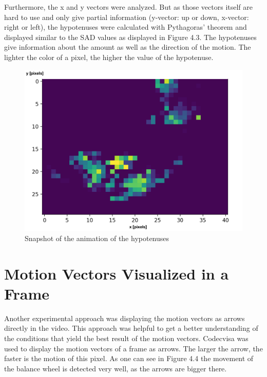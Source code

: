 \documentclass[12pt, a4paper]{report}
\begin{document}
    Furthermore, the x and y vectors were analyzed. But as those vectors itself are hard to use and only give partial information (y-vector: up or down, x-vector: right or left), the hypotenuses were calculated with Pythagoras' theorem and displayed similar to the SAD values as displayed in Figure 4.3. The hypotenuses give information about the amount as well as the direction of the motion. The lighter the color of a pixel, the higher the value of the hypotenuse.
 
        \noindent
    \begin{figure}[H]
    \centering
    \includegraphics[scale=0.6]{Images/animation_hypotenuse.png}
    
    \caption{Snapshot of the animation of the hypotenuses}
    \end{figure}
    
    \pagebreak
    
    \section{Motion Vectors Visualized in a Frame}
        Another experimental approach was displaying the motion vectors as arrows directly in the video. This approach was helpful to get a better understanding of the conditions that yield the best result of the motion vectors.
    Codecvisa was used to display the motion vectors of a frame as arrows. The larger the arrow, the faster is the motion of this pixel. As one can see in Figure 4.4 the movement of the balance wheel is detected very well, as the arrows are bigger there.
 
\end{document}
